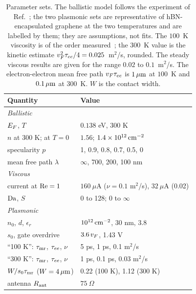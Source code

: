 \begin{table}
\caption{Parameter sets. The ballistic model follows the experiment of
Ref.~\cite{nguyen2021geometric}; the two plasmonic sets are representative of
hBN-encapsulated graphene at the two temperatures and are labelled by them;
they are assumptions, not fits. The $100$~K viscosity is of the order
measured~\cite{bandurin2016negative,krishnakumar2017superballistic}; the
$300$~K value is the kinetic estimate $v_{F}^{2}\tau_{ee}/4=0.025$~m$^{2}$/s,
rounded. The steady viscous results are given for the range $0.02$ to
$0.1$~m$^{2}$/s. The electron-electron mean free path $v_{F}\tau_{ee}$ is
$1\,\mu\mathrm{m}$ at $100$~K and $0.1\,\mu\mathrm{m}$ at $300$~K. $W$ is the contact width.}
\label{tab:params}
\begin{ruledtabular}
\begin{tabular}{ll}
Quantity & Value \\
\hline
\multicolumn{2}{l}{\textit{Ballistic}} \\
$E_{F}$, $T$ & $0.138$ eV, 300 K \\
$n$ at 300 K; at $T=0$ & $1.56$; $1.4\times10^{12}\,\mathrm{cm^{-2}}$ \\
specularity $p$ & 1, 0.9, 0.8, 0.7, 0.5, 0 \\
mean free path $\lambda$ & $\infty$, 700, 200, 100 nm \\
\multicolumn{2}{l}{\textit{Viscous}} \\
current at $\mathrm{Re}=1$ & $160\ \mu$A ($\nu=0.1$ m$^2$/s), $32\ \mu$A (0.02) \\
$\mathrm{Da}$, $S$ & 0 to 128; 0 to $\infty$ \\
\multicolumn{2}{l}{\textit{Plasmonic}} \\
$n_{0}$, $d$, $\epsilon_{r}$ & $10^{12}\,\mathrm{cm^{-2}}$, 30 nm, 3.8 \\
$s_{0}$, gate overdrive & $3.6\,v_{F}$, 1.43 V \\
``100 K'': $\tau_{\mathrm{mr}}$, $\tau_{ee}$, $\nu$ & 5 ps, 1 ps, 0.1 m$^2$/s \\
``300 K'': $\tau_{\mathrm{mr}}$, $\tau_{ee}$, $\nu$ & 1 ps, 0.1 ps, 0.03 m$^2$/s \\
$W/s_{0}\tau_{\mathrm{mr}}$ ($W=4\,\mu\mathrm{m}$) & 0.22 (100 K), 1.12 (300 K) \\
antenna $R_{\mathrm{ant}}$ & $75\ \Omega$ \\
\end{tabular}
\end{ruledtabular}
\end{table}
